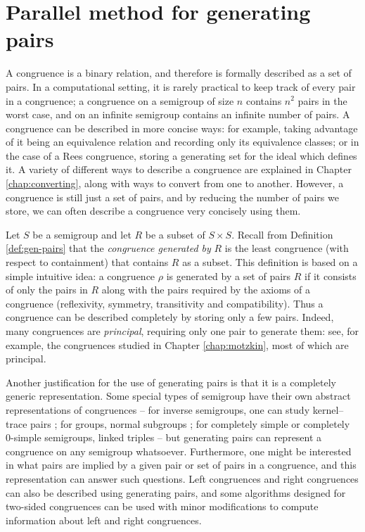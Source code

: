 \chapter{Parallel method for generating pairs}
\label{chap:pairs}

A congruence is a binary relation, and therefore is formally described as a set
of pairs.  In a computational setting, it is rarely practical to keep track of
every pair in a congruence; a congruence on a semigroup of size $n$ contains
$n^2$ pairs in the worst case, and on an infinite semigroup contains an infinite
number of pairs.  A congruence can be described in more concise ways:
for example, taking advantage of it being an equivalence relation
and recording only its equivalence classes; or in the case of a Rees congruence,
storing a generating set for the ideal which defines it.  A variety of different
ways to describe a congruence are explained in Chapter \ref{chap:converting},
along with ways to convert from one to another.  However, a congruence is still just
a set of pairs, and by reducing the number of pairs we store, we can often describe a
congruence very concisely using them.

Let $S$ be a semigroup and let $R$ be a subset of $S \times S$.  Recall from
Definition \ref{def:gen-pairs} that the \textit{congruence generated by} $R$ is
the least congruence (with respect to containment) that contains $R$ as a
subset.
This definition is based on a simple intuitive idea:
a congruence $\rho$ is generated by a set of pairs $R$ if it consists
of only the pairs in $R$ along with the pairs required by the axioms of a
congruence (reflexivity, symmetry, transitivity and compatibility).  Thus a
congruence can be described completely by storing only a few pairs.
Indeed, many congruences are \textit{principal}, requiring only one pair to
generate them: see, for example, the congruences studied in Chapter
\ref{chap:motzkin}, most of which are principal.

Another justification for the use of generating pairs is that it is a completely
generic representation.  Some special types of semigroup have their own abstract
representations of congruences -- for inverse semigroups, one can study
kernel--trace pairs \cite[\S 5.3]{howie}; for groups, normal subgroups
\cite[Theorem 11.5]{warner}; for completely simple or completely 0-simple
semigroups, linked triples \cite[\S 3.5]{howie} -- but generating pairs can
represent a congruence on any semigroup whatsoever.  Furthermore, one
might be interested in what pairs are implied by a given pair or set of pairs in
a congruence, and this representation can answer such questions.
Left congruences and right congruences can also be described using generating
pairs, and some algorithms designed for two-sided congruences can be used with
minor modifications to compute information about left and right congruences.

